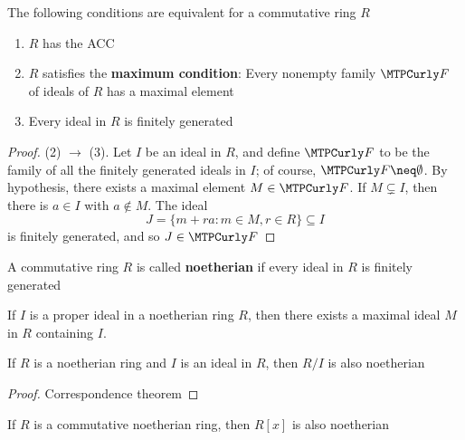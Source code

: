 \documentclass[11pt]{article}
\begin{document}
\begin{proposition}[]
The following conditions are equivalent for a commutative ring \(R\)
\begin{enumerate}
\item \(R\) has the ACC
\item \(R\) satisfies the \textbf{maximum condition}: Every nonempty family \(\calf\) of
ideals of \(R\) has a maximal element
\item Every ideal in \(R\) is finitely generated
\end{enumerate}
\end{proposition}

\begin{proof}
(2) \(\to\) (3). Let \(I\) be an ideal in \(R\), and define \(\calf\) to be the
family of all the finitely generated ideals in \(I\); of course,
\(\calf\neq\emptyset\). By hypothesis, there exists a maximal element
\(M\in\calf\). If \(M\subsetneq I\), then there is \(a\in I\) with 
\(a\not\in M\). The ideal
\begin{equation*}
J=\{m+ra:m\in M,r\in R\}\subseteq I
\end{equation*}
is finitely generated, and so \(J\in\calf\)
\end{proof}

\begin{definition}[]
A commutative ring \(R\) is called \textbf{noetherian} if every ideal in \(R\) is finitely generated
\end{definition}

\begin{corollary}[]
If \(I\) is a proper ideal in a noetherian ring \(R\), then there exists a
maximal ideal \(M\) in \(R\) containing \(I\).
\end{corollary}

\begin{corollary}[]
If \(R\) is a noetherian ring and \(I\) is an ideal in \(R\), then \(R/I\) is also
noetherian 
\end{corollary}

\begin{proof}
Correspondence theorem
\end{proof}

\begin{theorem}
If \(R\) is a commutative noetherian ring, then \(R[x]\) is also noetherian
\end{theorem}
\end{document}
